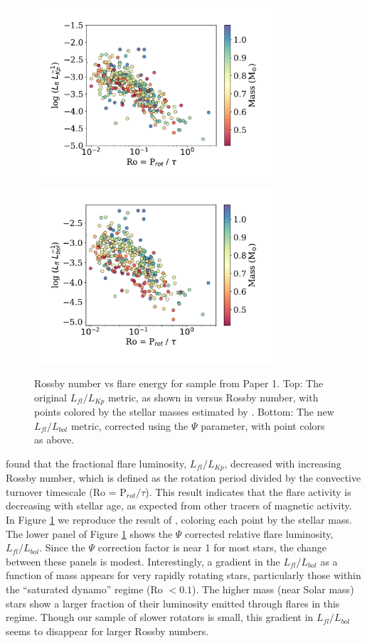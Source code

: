 \documentclass[preprint2]{aastex62}
\begin{document}
\begin{figure}[!t]
\centering
\includegraphics[width=3.5in]{fig4a}
\includegraphics[width=3.5in]{fig4b}
\caption{
Rossby number vs flare energy for sample from Paper 1.
Top: The original $L_{fl}/L_{Kp}$ metric, as shown in \citet{davenport2016} versus Rossby number, with points colored by the stellar masses estimated by \citet{davenport2016} .
Bottom: The new $L_{fl}/L_{bol}$ metric, corrected using the $\Psi$ parameter, with point colors as above.
}
\label{fig:rossby1}
\end{figure}
  

\citet{davenport2016} found that the fractional flare luminosity, $L_{fl}/L_{Kp}$, decreased with increasing Rossby number, which is defined as the rotation period divided by the convective turnover timescale (Ro = P$_{rot} / \tau$). This result indicates that the flare activity is decreasing with stellar age, as expected from other tracers of magnetic activity. In Figure \ref{fig:rossby1} we reproduce the result of \citet{davenport2016}, coloring each point by the stellar mass. The lower panel of Figure \ref{fig:rossby1} shows the $\Psi$ corrected relative flare luminosity, $L_{fl}/L_{bol}$. Since the $\Psi$ correction factor is near 1 for most stars, the change between these panels is modest. Interestingly, a gradient in the $L_{fl}/L_{bol}$ as a function of mass appears for very rapidly rotating stars, particularly those within the ``saturated dynamo'' regime (Ro $< 0.1$). The higher mass (near Solar mass) stars show a larger fraction of their luminosity emitted through flares in this regime. Though our sample of slower rotators is small, this gradient in $L_{fl}/L_{bol}$ seems to disappear for larger Rossby numbers. 
\end{document}
